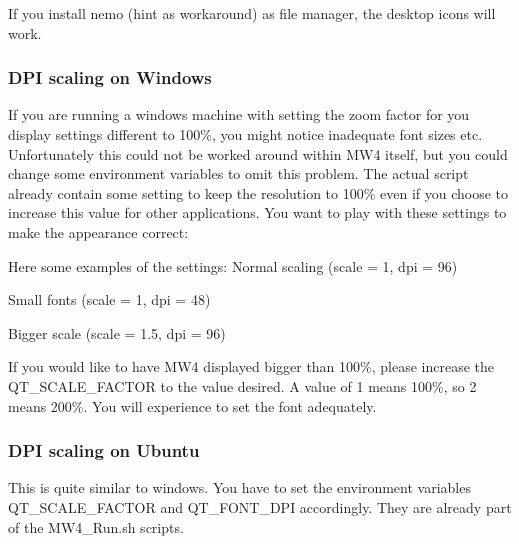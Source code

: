 \documentclass[a4paper,10pt,english]{sphinxmanual}
\begin{document}
\sphinxAtStartPar
If you install nemo (hint as workaround) as file manager, the desktop icons will work.


\subsubsection{DPI scaling on Windows}
\label{\detokenize{install/mw4:dpi-scaling-on-windows}}
\sphinxAtStartPar
If you are running a windows machine with setting the zoom factor for you display
settings different to 100\%, you might notice inadequate font sizes etc.
Unfortunately this could not be worked around within MW4 itself, but you could
change some environment variables to omit this problem. The actual script already
contain some setting to keep the resolution to 100\% even if you choose to increase
this value for other applications. You want to play with these settings to make
the appearance correct:

\begin{sphinxVerbatim}[commandchars=\\\{\}]
 
 
\end{sphinxVerbatim}

\sphinxAtStartPar
Here some examples of the settings: Normal scaling (scale = 1, dpi = 96)


\sphinxAtStartPar
Small fonts (scale = 1, dpi = 48)


\sphinxAtStartPar
Bigger scale (scale = 1.5, dpi = 96)


\sphinxAtStartPar
If you would like to have MW4 displayed bigger than 100\%, please increase the
QT\_SCALE\_FACTOR to the value desired. A value of 1 means 100\%, so 2 means 200\%.
You will experience to set the font adequately.


\subsubsection{DPI scaling on Ubuntu}
\label{\detokenize{install/mw4:dpi-scaling-on-ubuntu}}
\sphinxAtStartPar
This is quite similar to windows. You have to set the environment variables
QT\_SCALE\_FACTOR and QT\_FONT\_DPI accordingly. They are already part of the
MW4\_Run.sh scripts.
\end{document}
